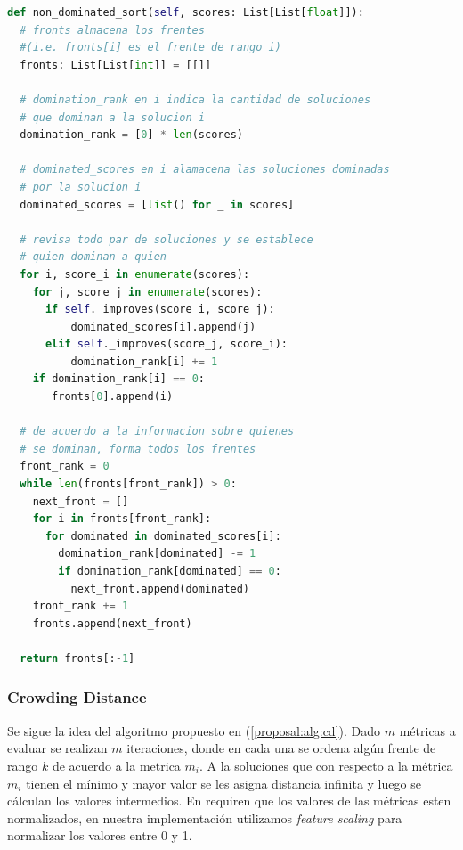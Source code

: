 \begin{lstlisting}[language=Python]
def non_dominated_sort(self, scores: List[List[float]]):
  # fronts almacena los frentes 
  #(i.e. fronts[i] es el frente de rango i)
  fronts: List[List[int]] = [[]]

  # domination_rank en i indica la cantidad de soluciones
  # que dominan a la solucion i
  domination_rank = [0] * len(scores)

  # dominated_scores en i alamacena las soluciones dominadas
  # por la solucion i
  dominated_scores = [list() for _ in scores]

  # revisa todo par de soluciones y se establece
  # quien dominan a quien
  for i, score_i in enumerate(scores):
    for j, score_j in enumerate(scores):
      if self._improves(score_i, score_j):
          dominated_scores[i].append(j)
      elif self._improves(score_j, score_i):
          domination_rank[i] += 1
    if domination_rank[i] == 0:
       fronts[0].append(i)

  # de acuerdo a la informacion sobre quienes
  # se dominan, forma todos los frentes
  front_rank = 0
  while len(fronts[front_rank]) > 0:
    next_front = []
    for i in fronts[front_rank]:
      for dominated in dominated_scores[i]:
        domination_rank[dominated] -= 1
        if domination_rank[dominated] == 0:
          next_front.append(dominated)
    front_rank += 1
    fronts.append(next_front)

  return fronts[:-1]
\end{lstlisting}

\subsubsection{Crowding Distance}
Se sigue la idea del algoritmo propuesto en (\ref{proposal:alg:cd}). Dado $m$ m\'etricas a evaluar se realizan $m$ iteraciones, donde en cada una se ordena alg\'un frente de rango $k$ de acuerdo a la metrica $m_i$. A la soluciones que con respecto a la m\'etrica $m_i$ tienen el m\'inimo y mayor valor se les asigna distancia infinita y luego se c\'alculan los valores intermedios. En \cite{deb2002fast} requiren que los valores de las m\'etricas esten normalizados, en nuestra implementaci\'on utilizamos \textit{feature scaling} para normalizar los valores entre 0 y 1.

